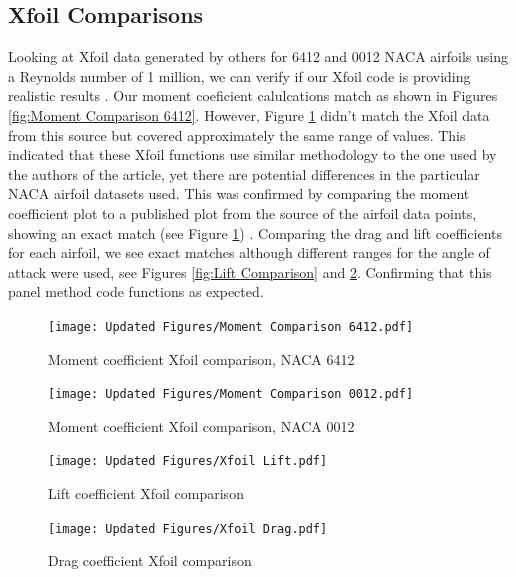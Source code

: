 \documentclass{article}
\begin{document}
\subsection{Xfoil Comparisons}
Looking at Xfoil data generated by others for 6412 and 0012 NACA airfoils using a Reynolds number of 1 million, we can verify if our Xfoil code is providing realistic results \cite{aerotoolbox_lift_drag_moment}. Our moment coeficient calulcations match as shown in Figures  \ref{fig:Moment Comparison 6412}. However, Figure \ref{fig:Moment Comparison 0012} didn't match the Xfoil data from this source but covered approximately the same range of values. This indicated that these Xfoil functions use similar methodology to the one used by the authors of the article, yet there are potential differences in the particular NACA airfoil datasets used. This was confirmed by comparing the moment coefficient plot to a published plot from the source of the airfoil data points, showing an exact match (see Figure \ref{fig:Moment Comparison 0012}) \cite{naca0012h}. Comparing the drag and lift coefficients for each airfoil, we see exact matches although different ranges for the angle of attack were used, see Figures  \ref{fig:Lift Comparison} and \ref{fig:Drag Comparison}. Confirming that this panel method code functions as expected.

\begin{figure}[h]
    \centering
\begin{minipage}[b]{0.45\textwidth}
\centering
\texttt{[image: Updated Figures/Moment Comparison 6412.pdf]}
\caption{\label{fig:Moment Comparison 6412}Moment coefficient Xfoil comparison, NACA 6412}
\end{minipage}
\begin{minipage}[b]{0.45\textwidth}
\centering
\texttt{[image: Updated Figures/Moment Comparison 0012.pdf]}
    \caption{Moment coefficient Xfoil comparison, NACA 0012}
    \label{fig:Moment Comparison 0012}
\end{minipage}
\end{figure}
\begin{figure}[h]
    \centering
\begin{minipage}[b]{0.45\textwidth}
\centering
\texttt{[image: Updated Figures/Xfoil Lift.pdf]}
\caption{\label{fig:Lift Comparison}Lift coefficient Xfoil comparison}
\end{minipage}
\begin{minipage}[b]{0.45\textwidth}
\centering
\texttt{[image: Updated Figures/Xfoil Drag.pdf]}
\caption{\label{fig:Drag Comparison}Drag coefficient Xfoil comparison}
\end{minipage}
\end{figure}
\end{document}

